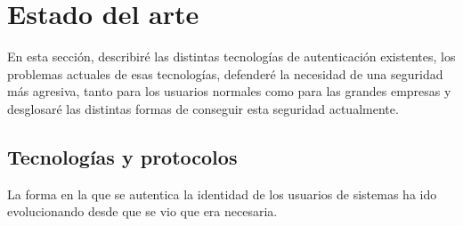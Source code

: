 \documentclass[titlepage]{article}
\begin{document}

\section{Estado del arte}
En esta sección, describiré las distintas tecnologías de autenticación existentes, los problemas actuales de esas tecnologías, defenderé la necesidad de una seguridad más agresiva, tanto para los usuarios normales como para las grandes empresas y desglosaré las distintas formas de conseguir esta seguridad actualmente.
\subsection{Tecnologías y protocolos}
La forma en la que se autentica la identidad de los usuarios de sistemas ha ido evolucionando desde que se vio que era necesaria.
\end{document}
